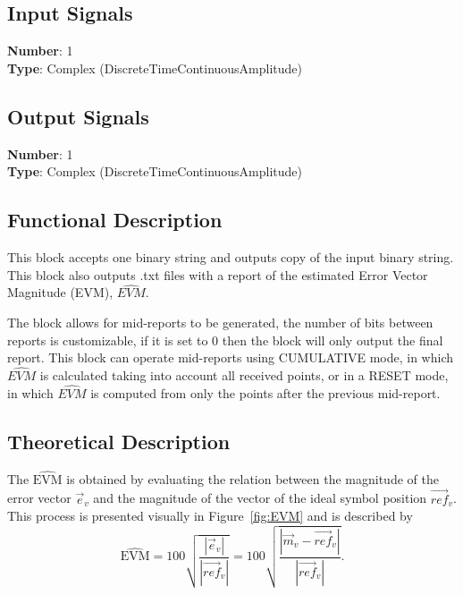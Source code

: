 \begin{refsection}
\begin{itemize}
\end{itemize}




\subsection*{Input Signals}

\textbf{Number}: 1\\
\textbf{Type}: Complex (DiscreteTimeContinuousAmplitude)


\subsection*{Output Signals}

\textbf{Number}: 1\\
\textbf{Type}: Complex (DiscreteTimeContinuousAmplitude)

\subsection*{Functional Description}

This block accepts one binary string and outputs copy of the input binary string. This block also outputs .txt files with a report of the estimated Error Vector Magnitude (EVM), $\widehat{EVM}$.
\par
The block allows for mid-reports to be generated, the number of bits between reports is customizable, if it is set to 0 then the block will only output the final report. This block can operate mid-reports using CUMULATIVE mode, in which $\widehat{EVM}$ is calculated taking into account all received points, or in a RESET mode, in which $\widehat{EVM}$ is computed from only the points after the previous mid-report.

\subsection*{Theoretical Description}

The $\widehat{\text{EVM}}$ is obtained by evaluating the relation between the magnitude of the error vector $\vec{e}_v$ and the magnitude of the vector of the ideal symbol position $\vec{ref}_v$. This process is presented visually in Figure~\ref{fig:EVM} and is described by
\begin{equation}
\widehat{\text{EVM}}=100\sqrt{\frac{|\vec{e}_v|}{|\vec{ref}_v|}}=100\sqrt{\frac{|\vec{m}_v-\vec{ref}_v|}{|\vec{ref}_v|}}.
\end{equation}



\clearpage
\printbibliography[heading=subbibliography]
\end{refsection}
\cleardoublepage
